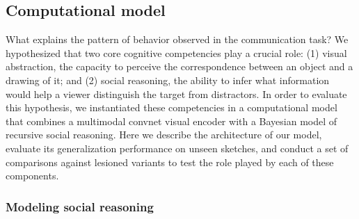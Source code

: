 \documentclass[9pt,twocolumn,twoside]{pnas-new}
\begin{document}

\subsection*{Computational model}

What explains the pattern of behavior observed in the communication task? We hypothesized that two core cognitive competencies play a crucial role: (1) visual abstraction, the capacity to perceive the correspondence between an object and a drawing of it; and (2) social reasoning, the ability to infer what information would help a viewer distinguish the target from distractors. In order to evaluate this hypothesis, we instantiated these competencies in a computational model that combines a multimodal convnet visual encoder with a Bayesian model of recursive social reasoning. Here we describe the architecture of our model, evaluate its generalization performance on unseen sketches, and conduct a set of comparisons against lesioned variants to test the role played by each of these components.




\subsubsection*{Modeling social reasoning}
\end{document}
